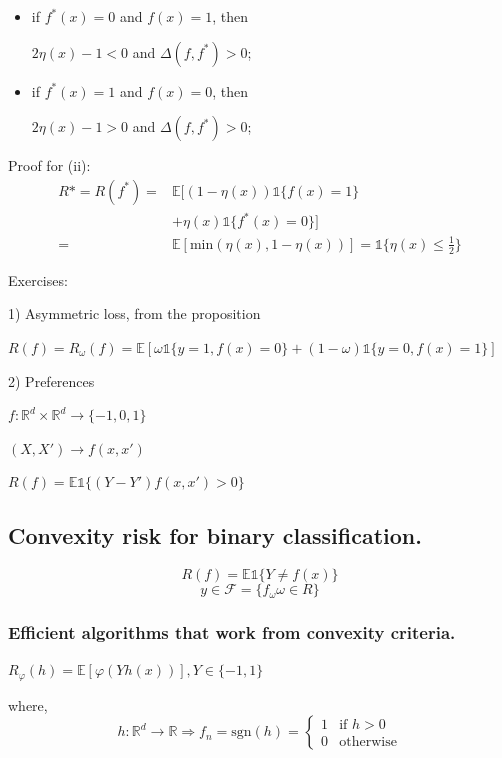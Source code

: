 	     \begin{itemize}
		      \item if $f^*(x)=0$ and $f(x)=1$, then 

						$2\eta(x)-1<0$ and $\Delta(f,f^*)>0$; 

			   \item if $f^*(x)=1$ and $f(x)=0$, then  

						$2\eta(x)-1>0$ and $\Delta(f,f^*)>0$; 
	     \end{itemize}

	     Proof for (ii):
        \begin{align*}
            R* = R(f^*)= &  \mathbb{E}[(1-\eta(x))\mathds{1}\{f(x)=1\} \\
           								  &  + \eta(x)\mathds{1}\{f^*(x)=0\}]\\
            						 = &  \mathbb{E}[\text{min}(\eta(x),1-\eta(x))]=\mathds{1}\{\eta(x)\leq \frac{1}{2}\}
        \end{align*}

	     Exercises:

	     1) Asymmetric loss, from the proposition 

        $R(f)=R_{\omega}(f) = \mathbb{E}[\omega \mathds{1}\{y=1,f(x)=0\} + (1-\omega)\mathds{1}\{y=0,f(x)=1\}]$

	     2) Preferences 

        $f:\mathbb{R}^d\times\mathbb{R}^d\rightarrow\{-1,0,1\}$

        $(X,X') \rightarrow f(x,x')$

        $R(f)=\mathbb{E}\mathds{1}\{(Y-Y')f(x,x')>0\}$

	   \subsection{Convexity risk for binary classification.}

			\[
				R(f) = \mathbb{E} \mathds{1}\{Y\neq f(x)\}
			\]
			\[
				y\in \mathcal{F}=\{f_{\omega}\omega \in R\}
			\]

			\subsubsection{Efficient algorithms that work from convexity criteria.}
					$R_{\varphi}(h)=\mathbb{E}[\varphi (Yh(x))], Y \in \{-1,1\}$

					where,
					\[
						h:\mathbb{R}^d\rightarrow\mathbb{R} \Rightarrow f_n=
							\mbox{sgn}(h)=\begin{cases}
        																1  & \mbox{if } h>0 \\
       																0 & \mbox{otherwise}
        														\end{cases}
					\]

